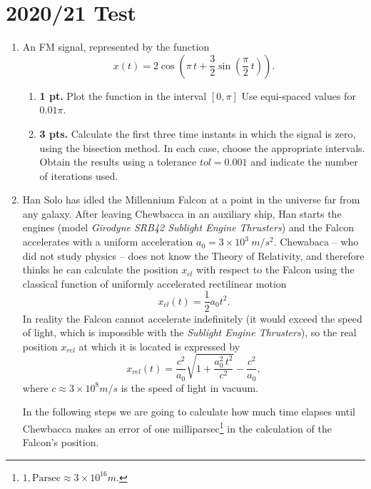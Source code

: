 \section{2020/21 Test}
\begin{enumerate}
\item An FM signal, represented by the function
\begin{equation}
	x(t) = 2\cos\left(\pi \, t+ \frac{3}{2}\sin\left(\frac{\pi}{2} \, t\right)\right).
\end{equation}
\begin{enumerate}
	\item \textbf{1 pt.} Plot the function in the interval $[0,\pi]$ Use equi-spaced values for $0.01\pi$.
	
    \item \textbf{3 pts. } Calculate the first three time instants in which the signal is zero, using the bisection method. In each case, choose the appropriate intervals. Obtain the results using a tolerance $tol=0.001$ and indicate the number of iterations used.
\end{enumerate}

\item  Han Solo has idled the Millennium Falcon at a point in the universe far from any galaxy. After leaving Chewbacca in an auxiliary ship, Han starts the engines (model \emph{Girodyne SRB42 Sublight Engine Thrusters}) and the Falcon accelerates with a uniform acceleration $a_0 = 3\times10^3\ m/s^2$. Chewabaca -- who did not study physics -- does not know the Theory of Relativity, and therefore thinks he can calculate the position $x_{cl}$ with respect to the Falcon using the classical function of uniformly accelerated rectilinear motion
\begin{equation}
	x_{cl}(t) =\frac{1}{2}a_0t^2.
\end{equation}
		In reality the Falcon cannot accelerate indefinitely (it would exceed the speed of light, which is impossible with the \emph{Sublight Engine Thrusters}), so the real position $x_{rel}$ at which it is located is expressed by
\begin{equation}
	x_{rel}(t) = \frac{c^2}{a_0}\sqrt{1 + \frac{a_0^2\,t^2}{c^2}} -\frac{c^2}{a_0}, 
\end{equation}
		where $c \approx 3\times 10^8 m/s$  is the speed of light in vacuum. 

		In the following steps we are going to calculate how much time elapses until Chewbacca makes an error of one milliparsec\footnote{$1,\text{Parsec} \approx 3\times 10^{16}m$.} in the calculation of the Falcon's position.


\end{enumerate}

